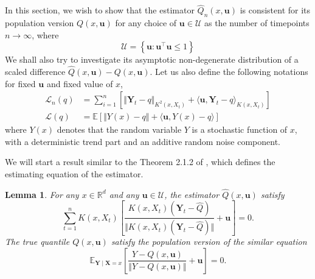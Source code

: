 \documentclass[11pt]{article}
\def\E{\mathbb{E}}
\def\R{\mathbb{R}}
\newcommand{\bb}[1]{\boldsymbol{#1}}
\newcommand{\Lcal}{\mathcal{L}}
\newcommand{\tr}{^{\intercal}}
\theoremstyle{general}
\newtheorem{lemma}{Lemma}
\numberwithin{equation}{section}
\begin{document}
In this section, we wish to show that the estimator $\widehat{Q}_n(x, \bb{u})$ is consistent for its population version $Q(x, \bb{u})$ for any choice of $\bb{u} \in \mathcal{U}$ as the number of timepoints $n \rightarrow \infty$, where
\begin{equation*}
    \mathcal{U} = \left\{ \bb{u}: \bb{u}\tr \bb{u} \leq 1 \right\}
\end{equation*}
\noindent We shall also try to investigate its asymptotic non-degenerate distribution of a scaled difference $\widehat{Q}(x, \bb{u}) - Q(x, \bb{u})$. Let us also define the following notations for fixed $\bb{u}$ and fixed value of $x$,
\begin{equation*}
    \begin{split}
        \Lcal_{n}(q) & = \sum_{i=1}^n \left[ \Vert \bb{Y}_t - q\Vert_{K^2(x, X_t)} + \langle \bb{u}, \bb{Y}_t - q \rangle_{K(x,X_t)} \right]\\
        \Lcal(q) & = \E\left[ \Vert Y(x) - q\Vert + \langle \bb{u}, Y(x) - q\rangle \right]
    \end{split}
\end{equation*}
\noindent where $Y(x)$ denotes that the random variable $Y$ is a stochastic function of $x$, with a deterministic trend part and an additive random noise component. 

We will start a result similar to the Theorem 2.1.2 of \cite{chaudhuri1996geometric}, which defines the estimating equation of the estimator.

\begin{lemma}\label{lemma:estimating-eqn}
    For any $x \in \R^d$ and any $\bb{u} \in \mathcal{U}$, the estimator $\widehat{Q}(x, \bb{u})$ satisfy 
    \begin{equation}
        \sum_{t=1}^n K(x, X_t) \left[\dfrac{K(x, X_t)(\bb{Y}_t - \widehat{Q})  }{ \Vert K(x, X_t)(\bb{Y}_t - \widehat{Q}) \Vert } + \bb{u}\right] = 0.
        \label{eqn:est-equation}
    \end{equation}
    The true quantile $Q(x, \bb{u})$ satisfy the population version of the similar equation 
    \begin{equation}
        \E_{\bb{Y} \mid \bb{X} = x}\left[ \dfrac{Y- Q(x, \bb{u}) }{\Vert Y- Q(x, \bb{u}) \Vert } + \bb{u}\right] = 0.
        \label{eqn:est-equation-true}
    \end{equation}
\end{lemma}
\end{document}
